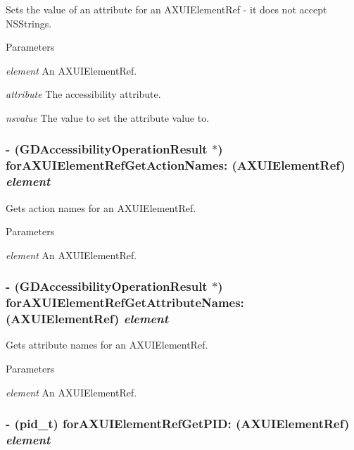 Sets the value of an attribute for an AXUIElementRef -\/ it does not accept NSStrings. 
\begin{DoxyParams}{Parameters}
\item[{\em element}]An AXUIElementRef. \item[{\em attribute}]The accessibility attribute. \item[{\em nsvalue}]The value to set the attribute value to. \end{DoxyParams}
\hypertarget{interface_g_d_accessibility_manager_af7ed61beb0c1683b0e8a766ecd977547}{
\subsubsection[{forAXUIElementRefGetActionNames:}]{\setlength{\rightskip}{0pt plus 5cm}-\/ ({\bf GDAccessibilityOperationResult} $\ast$) forAXUIElementRefGetActionNames: (AXUIElementRef) {\em element}}}
\label{interface_g_d_accessibility_manager_af7ed61beb0c1683b0e8a766ecd977547}


Gets action names for an AXUIElementRef. 
\begin{DoxyParams}{Parameters}
\item[{\em element}]An AXUIElementRef. \end{DoxyParams}
\hypertarget{interface_g_d_accessibility_manager_a25f20499558c7b5bbd4fccca578fbefe}{
\subsubsection[{forAXUIElementRefGetAttributeNames:}]{\setlength{\rightskip}{0pt plus 5cm}-\/ ({\bf GDAccessibilityOperationResult} $\ast$) forAXUIElementRefGetAttributeNames: (AXUIElementRef) {\em element}}}
\label{interface_g_d_accessibility_manager_a25f20499558c7b5bbd4fccca578fbefe}


Gets attribute names for an AXUIElementRef. 
\begin{DoxyParams}{Parameters}
\item[{\em element}]An AXUIElementRef. \end{DoxyParams}
\hypertarget{interface_g_d_accessibility_manager_a77c4e5a6c3c879ba3a1a4d305c2ebd31}{
\subsubsection[{forAXUIElementRefGetPID:}]{\setlength{\rightskip}{0pt plus 5cm}-\/ (pid\_\-t) forAXUIElementRefGetPID: (AXUIElementRef) {\em element}}}
\label{interface_g_d_accessibility_manager_a77c4e5a6c3c879ba3a1a4d305c2ebd31}


